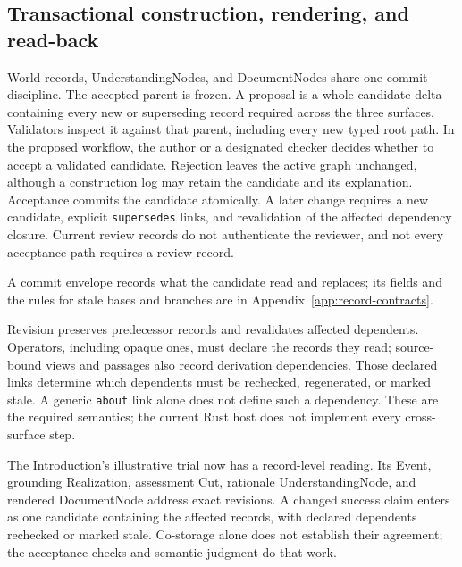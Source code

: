 \documentclass[11pt,a4paper]{article}
\begin{document}
\subsection{Transactional construction, rendering, and read-back}
\label{sec:construction-protocol}

World records, UnderstandingNodes, and DocumentNodes share one commit discipline.
The accepted parent is frozen. A proposal is a whole candidate delta containing
every new or superseding record required across the three surfaces. Validators
inspect it against that parent, including every new typed root path. In the
proposed workflow, the author or a designated checker decides whether to accept
a validated candidate. Rejection leaves the active graph unchanged, although a
construction log may retain the candidate and its explanation. Acceptance commits
the candidate atomically. A later change requires a new candidate, explicit
\texttt{supersedes} links, and revalidation of the affected dependency closure.
Current review records do not authenticate the reviewer, and not every
acceptance path requires a review record.

A commit envelope records what the candidate read and replaces; its fields and
the rules for stale bases and branches are in Appendix~\ref{app:record-contracts}.

Revision preserves predecessor records and revalidates affected dependents.
Operators, including opaque ones, must declare the records they read; source-bound
views and passages also record derivation dependencies. Those declared links
determine which dependents must be rechecked, regenerated, or marked stale.
A generic \texttt{about} link alone does not define such a dependency. These
are the required semantics; the current Rust host does not implement every
cross-surface step.

The Introduction's illustrative trial now has a record-level reading. Its
Event, grounding Realization, assessment Cut, rationale UnderstandingNode, and
rendered DocumentNode address exact revisions. A changed success claim enters
as one candidate containing the affected records, with declared dependents
rechecked or marked stale. Co-storage alone does not establish their agreement;
the acceptance checks and semantic judgment do that work.
\end{document}

